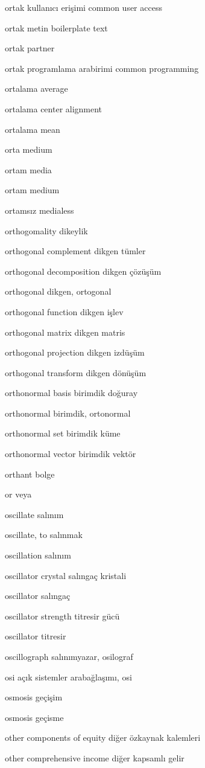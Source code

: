 \documentclass[12pt,fleqn]{article}\usepackage{../../common}
\begin{document}
ortak kullanıcı erişimi common user access

ortak metin boilerplate text

ortak partner

ortak programlama arabirimi common programming

ortalama average

ortalama center alignment

ortalama mean

orta medium

ortam media

ortam medium

ortamsız medialess

orthogomality dikeylik

orthogonal complement dikgen tümler

orthogonal decomposition dikgen çözüşüm

orthogonal dikgen, ortogonal

orthogonal function dikgen işlev

orthogonal matrix dikgen matris

orthogonal projection dikgen izdüşüm

orthogonal transform dikgen dönüşüm

orthonormal basis birimdik doğuray

orthonormal birimdik, ortonormal

orthonormal set birimdik küme

orthonormal vector birimdik vektör

orthant bolge

or veya

oscillate salınım

oscillate, to salınmak

oscillation salınım

oscillator crystal salıngaç kristali

oscillator salıngaç

oscillator strength titresir gücü

oscillator titresir

oscillograph salınımyazar, osilograf

osi açık sistemler arabağlaşımı, osi

osmosis geçişim

osmosis geçisme

other components of equity diğer özkaynak kalemleri

other comprehensive income diğer kapsamlı gelir
\end{document}
